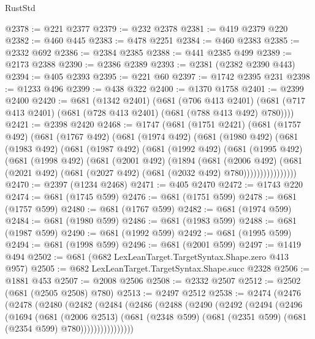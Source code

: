 \begin{lexlean}{RustStd}
\begin{coremodule}
@2378 := @221 @2377
@2379 := @232 @2378
@2381 := @419 @2379 @220
@2382 := @460 @445
@2383 := @478 @2251
@2384 := @460 @2383
@2385 := @2332 @692
@2386 := @2384 @2385
@2388 := @441 @2385 @499
@2389 := @2173 @2388
@2390 := @2386 @2389
@2393 := @2381 (@2382 @2390 @443)
@2394 := @405 @2393
@2395 := @221 @60
@2397 := @1742 @2395 @231
@2398 := @1233 @496
@2399 := @438 @322
@2400 := @1370 @1758
@2401 := @2399 @2400
@2420 := @681
    (@1342 @2401)
    (@681
      (@706 @413 @2401)
      (@681 (@717 @413 @2401) (@681 (@728 @413 @2401) (@681 (@788 @413 @492) @780))))
@2421 := @2398 @2420
@2468 := @1747
    (@681
      (@1751 @2421)
      (@681
        (@1757 @492)
        (@681
          (@1767 @492)
          (@681
            (@1974 @492)
            (@681
              (@1980 @492)
              (@681
                (@1983 @492)
                (@681
                  (@1987 @492)
                  (@681
                    (@1992 @492)
                    (@681
                      (@1995 @492)
                      (@681
                        (@1998 @492)
                        (@681
                          (@2001 @492)
                          (@1894
                            (@681
                              (@2006 @492)
                              (@681
                                (@2021 @492)
                                (@681 (@2027 @492) (@681 (@2032 @492) @780))))))))))))))))
@2470 := @2397 (@1234 @2468)
@2471 := @405 @2470
@2472 := @1743 @220
@2474 := @681 (@1745 @599)
@2476 := @681 (@1751 @599)
@2478 := @681 (@1757 @599)
@2480 := @681 (@1767 @599)
@2482 := @681 (@1974 @599)
@2484 := @681 (@1980 @599)
@2486 := @681 (@1983 @599)
@2488 := @681 (@1987 @599)
@2490 := @681 (@1992 @599)
@2492 := @681 (@1995 @599)
@2494 := @681 (@1998 @599)
@2496 := @681 (@2001 @599)
@2497 := @1419 @494
@2502 := @681 (@682 LexLeanTarget.TargetSyntax.Shape.zero @413 @957)
@2505 := @682 LexLeanTarget.TargetSyntax.Shape.succ @2328
@2506 := @1881 @453
@2507 := @2008 @2506
@2508 := @2332 @2507
@2512 := @2502 (@681 (@2505 @2508) @780)
@2513 := @2497 @2512
@2538 := @2474
    (@2476
      (@2478
        (@2480
          (@2482
            (@2484
              (@2486
                (@2488
                  (@2490
                    (@2492
                      (@2494
                        (@2496
                          (@1694
                            (@681
                              (@2006 @2513)
                              (@681
                                (@2348 @599)
                                (@681 (@2351 @599) (@681 (@2354 @599) @780))))))))))))))))

\end{coremodule}
\end{lexlean}
